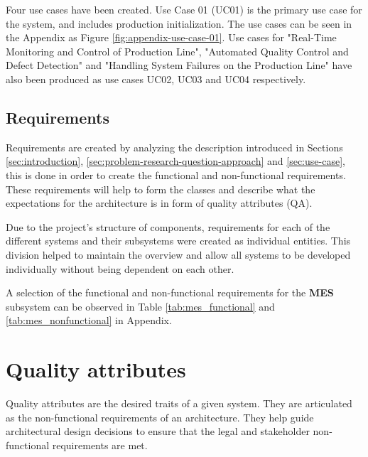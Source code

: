 Four use cases have been created. Use Case 01 (UC01) is the primary use case for the system, and includes production initialization. The use cases can be seen in the Appendix as Figure \ref{fig:appendix-use-case-01}. Use cases for "Real-Time Monitoring and Control of Production Line", "Automated Quality Control and Defect Detection" and "Handling System Failures on the Production Line" have also been produced as use cases UC02, UC03 and UC04 respectively.

\subsection{Requirements}
Requirements are created by analyzing the description introduced in Sections \ref{sec:introduction}, \ref{sec:problem-research-question-approach} and \ref{sec:use-case}, this is done in order to create the functional and non-functional requirements. These requirements will help to form the classes and describe what the expectations for the architecture is in form of quality attributes (QA).

Due to the project's structure of components, requirements for each of the different systems and their subsystems were created as individual entities. This division helped to maintain the overview and allow all systems to be developed individually without being dependent on each other. 


A selection of the functional and non-functional requirements for the \textbf{MES} subsystem can be observed in Table \ref{tab:mes_functional} and \ref{tab:mes_nonfunctional} in Appendix.

\section{Quality attributes} \label{sec:quality-attribute-scenario}
Quality attributes are the desired traits of a given system. 
They are articulated as the non-functional requirements of an architecture. They help guide architectural design decisions to ensure that the legal and stakeholder non-functional requirements are met.

